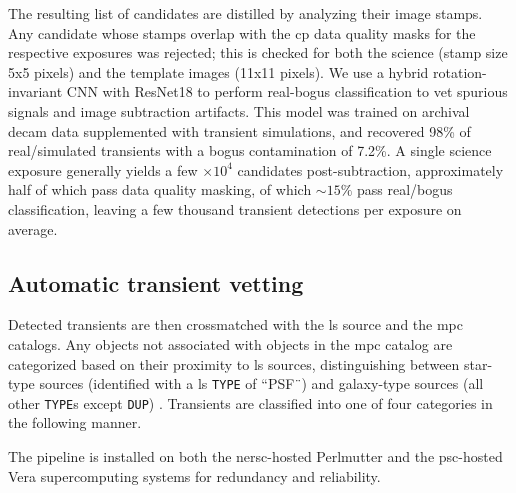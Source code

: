 \documentclass[twocolumn]{aastex631}
\begin{document}
The resulting list of candidates are distilled by analyzing their image stamps.
Any candidate whose stamps overlap with the \gls{cp} data quality masks for the respective exposures was rejected; this is checked for both the science (stamp size 5x5 pixels) and the template images (11x11 pixels).
We use a hybrid rotation-invariant CNN with ResNet18 \citep{2022FrASS...9.7100S} to perform real-bogus classification to vet spurious signals and image subtraction artifacts.
This model was trained on archival \gls{decam} data supplemented with transient simulations, and recovered 98\% of real/simulated transients with a bogus contamination of 7.2\%.
A single science exposure generally yields a few $\times 10^4$ candidates post-subtraction, approximately half of which pass data quality masking, of which $\sim15\%$ pass real/bogus classification, leaving a few thousand transient detections per exposure on average.

\subsection{Automatic transient vetting}\label{subsec:transvet}

Detected transients are then crossmatched with the \gls{ls} source and the \gls{mpc} catalogs.
Any objects not associated with objects in the \gls{mpc} catalog are categorized based on their proximity to \gls{ls} sources, distinguishing between star-type sources (identified with a \gls{ls} \texttt{TYPE} of ``PSF¨) and galaxy-type sources (all other \texttt{TYPE}s except \texttt{DUP}) \citep{sectionX.X,LS paper}.
Transients are classified into one of four categories in the following manner.


The pipeline is installed on both the \gls{nersc}-hosted Perlmutter and the \gls{psc}-hosted Vera supercomputing systems for redundancy and reliability.


\end{document}

